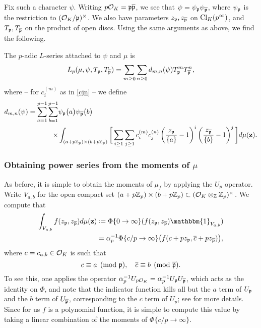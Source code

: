 \documentclass[a4paper,11pt]{article}
\numberwithin{equation}{section}
\begin{document}
Fix such a character $\psi$. Writing $p\mathcal{O}_K = \mathfrak{p}\overline{\mathfrak{p}}$, we see that $\psi = \psi_{\mathfrak{p}}\psi_{\overline{\mathfrak{p}}}$, where $\psi_{\mathfrak{p}}$ is the restriction to $(\mathcal{O}_K/\mathfrak{p})^\times$. We also have parameters $z_{\mathfrak{p}}, z_{\overline{\mathfrak{p}}}$ on $\mathrm{Cl}_K(p^\infty)$, and $T_{\mathfrak{p}}, T_{\overline{\mathfrak{p}}}$ on the product of open discs. Using the same arguments as above, we find the following.

\begin{proposition}
The $p$-adic $L$-series attached to $\psi$ and $\mu$ is
\[
	L_p(\mu,\psi,T_{\mathfrak{p}},T_{\overline{\mathfrak{p}}}) = \sum_{m\geq 0}\sum_{n\geq 0} d_{m,n}(\psi) T_{\mathfrak{p}}^mT_{\overline{\mathfrak{p}}}^n,
\]
where -- for $c_i^{(m)}$ as in \eqref{cjn} -- we define
\begin{align*}
    d_{m,n}(\psi) = \sum_{a=1}
^{p-1}\sum_{b=1}^{p-1} &\psi_{\mathfrak{p}}\big(a\big) \psi_{\overline{\mathfrak{p}}}\big(b\big) \\
\times &\int_{(a+p\mathbb{Z}_p) \times (b+p\mathbb{Z}_p)} \bigg[ \sum_{i\geq 1} \sum_{j\geq 1} c_i^{(m)} c_j^{(n)} \left(\frac{z_{\mathfrak{p}}}{\{a\}}-1\right)^i \left(\frac{z_{\overline{\mathfrak{p}}}}{\{b\}}-1\right)^j \bigg]d\mu(\mathbf{z}) .
\end{align*}
\end{proposition}

\subsubsection{Obtaining power series from the moments of \texorpdfstring{$\mu$}{mu}}
As before, it is simple to obtain the moments of $\mu_f$ by applying the $U_p$ operator. Write $V_{a,b}$ for the open compact set $(a+p\mathbb{Z}_p)\times(b+p\mathbb{Z}_p) \subset (\mathcal{O}_K\otimes_{\mathbb{Z}}\mathbb{Z}_p)^\times$. We compute that
\begin{align}\label{eqn:moments}
	\int_{V_{a,b}}f(z_{\pri},z_{\pribar}) d\mu(\mathbf{z}) &\defeq \Phi\{0\rightarrow\infty\}(f(z_{\pri},z_{\pribar})\mathbbm{1}_{V_{a,b}}) \\
    &= \alpha_{p}^{-1}\Phi\{c/p \rightarrow \infty\}\big(f(c + pz_{\pri}, \overline{c} + pz_{\pribar})\big), \notag
    \end{align}
where $c = c_{a,b} \in \mathcal{O}_K$ is such that
\[
	c \equiv a \pmod{\mathfrak{p}},\quad \overline{c}\equiv b\pmod{\overline{\mathfrak{p}}}.
\]
To see this, one applies the operator $\alpha_p^{-1}U_{p\mathcal{O}_K} = \alpha_p^{-1}U_{\mathfrak{p}}U_{\overline{\mathfrak{p}}}$, which acts as the identity on $\Phi$, and note that the indicator function kills all but the $a$ term of $U_{\mathfrak{p}}$ and the $b$ term of $U_{\overline{\mathfrak{p}}}$, corresponding to the $c$ term of $U_p$; see \cite[\S7.1]{Wil17} for more details. Since for us $f$ is a polynomial function, it is simple to compute this value by taking a linear combination of the moments of $\Phi\{c/p\rightarrow \infty\}$.
\end{document}
